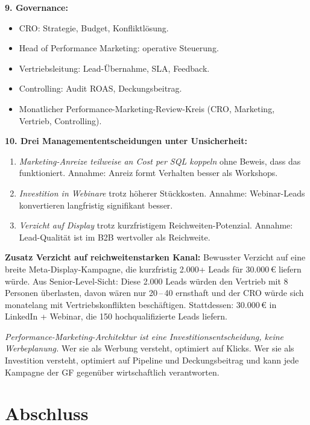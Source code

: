 \documentclass[11pt,a4paper,oneside]{article}
\begin{document}
\begin{loesungbox}
\textbf{9. Governance:}
\begin{itemize}
  \item CRO: Strategie, Budget, Konfliktlösung.
  \item Head of Performance Marketing: operative Steuerung.
  \item Vertriebsleitung: Lead-Übernahme, SLA, Feedback.
  \item Controlling: Audit ROAS, Deckungsbeitrag.
  \item Monatlicher Performance-Marketing-Review-Kreis (CRO, Marketing, Vertrieb, Controlling).
\end{itemize}

\textbf{10. Drei Managemententscheidungen unter Unsicherheit:}
\begin{enumerate}
  \item \emph{Marketing-Anreize teilweise an Cost per SQL koppeln} \textendash{} ohne Beweis, dass das funktioniert. Annahme: Anreiz formt Verhalten besser als Workshops.
  \item \emph{Investition in Webinare} trotz höherer Stückkosten. Annahme: Webinar-Leads konvertieren langfristig signifikant besser.
  \item \emph{Verzicht auf Display} trotz kurzfristigem Reichweiten-Potenzial. Annahme: Lead-Qualität ist im B2B wertvoller als Reichweite.
\end{enumerate}

\textbf{Zusatz \textendash{} Verzicht auf reichweitenstarken Kanal:}
Bewusster Verzicht auf eine breite Meta-Display-Kampagne, die kurzfristig 2.000+ Leads für 30.000\,\euro{} liefern würde. Aus Senior-Level-Sicht: Diese 2.000 Leads würden den Vertrieb mit 8 Personen überlasten, davon wären nur 20\,--\,40 ernsthaft \textendash{} und der CRO würde sich monatelang mit Vertriebskonflikten beschäftigen. Stattdessen: 30.000\,\euro{} in LinkedIn + Webinar, die 150 hochqualifizierte Leads liefern.

\begin{merkbox}
\emph{Performance-Marketing-Architektur ist eine Investitionsentscheidung, keine Werbeplanung.} Wer sie als Werbung versteht, optimiert auf Klicks. Wer sie als Investition versteht, optimiert auf Pipeline und Deckungsbeitrag \textendash{} und kann jede Kampagne der GF gegenüber wirtschaftlich verantworten.
\end{merkbox}
\end{loesungbox}

\clearpage

\section*{Abschluss}
\thispagestyle{plain}
\end{document}
